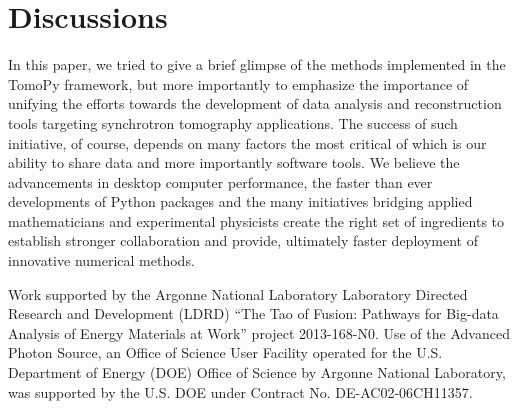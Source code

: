 \documentclass[pdf]{iucr}              %
\begin{document}


\section{Discussions}

In this paper, we tried to give a brief glimpse of the methods implemented in the TomoPy framework, but more importantly to emphasize the importance of unifying the efforts towards the development of data analysis and reconstruction tools targeting synchrotron tomography applications. The success of such initiative, of course, depends on many factors the most critical of which is our ability to share data and more importantly software tools. We believe the advancements in desktop computer performance, the faster than ever developments of Python packages and the many initiatives bridging applied mathematicians and experimental physicists create the right set of ingredients to establish stronger collaboration and provide, ultimately faster deployment of innovative numerical methods.





Work supported by the Argonne National Laboratory Laboratory Directed Research and Development (LDRD) ``The Tao of Fusion: Pathways for Big-data Analysis of Energy Materials at Work'' project 2013-168-N0. Use of the Advanced Photon Source, an Office of Science User Facility operated for the U.S. Department of Energy (DOE) Office of Science by Argonne National Laboratory, was supported by the U.S. DOE under Contract No. DE-AC02-06CH11357. 
\end{document}
